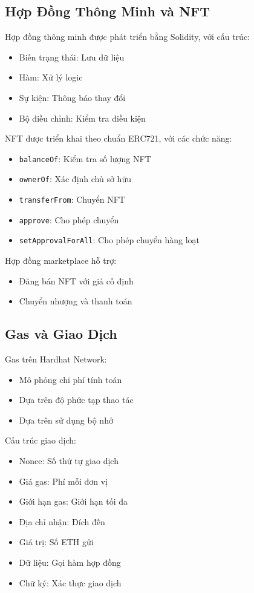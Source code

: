 \subsection{Hợp Đồng Thông Minh và NFT}
Hợp đồng thông minh được phát triển bằng Solidity, với cấu trúc:
\begin{itemize}
    \item Biến trạng thái: Lưu dữ liệu
    \item Hàm: Xử lý logic
    \item Sự kiện: Thông báo thay đổi
    \item Bộ điều chỉnh: Kiểm tra điều kiện
\end{itemize}
NFT được triển khai theo chuẩn ERC721, với các chức năng:
\begin{itemize}
    \item \texttt{balanceOf}: Kiểm tra số lượng NFT
    \item \texttt{ownerOf}: Xác định chủ sở hữu
    \item \texttt{transferFrom}: Chuyển NFT
    \item \texttt{approve}: Cho phép chuyển
    \item \texttt{setApprovalForAll}: Cho phép chuyển hàng loạt
\end{itemize}
Hợp đồng marketplace hỗ trợ:
\begin{itemize}
    \item Đăng bán NFT với giá cố định
    \item Chuyển nhượng và thanh toán
\end{itemize}

\subsection{Gas và Giao Dịch}
Gas trên Hardhat Network:
\begin{itemize}
    \item Mô phỏng chi phí tính toán
    \item Dựa trên độ phức tạp thao tác
    \item Dựa trên sử dụng bộ nhớ
\end{itemize}
Cấu trúc giao dịch:
\begin{itemize}
    \item Nonce: Số thứ tự giao dịch
    \item Giá gas: Phí mỗi đơn vị
    \item Giới hạn gas: Giới hạn tối đa
    \item Địa chỉ nhận: Đích đến
    \item Giá trị: Số ETH gửi
    \item Dữ liệu: Gọi hàm hợp đồng
    \item Chữ ký: Xác thực giao dịch
\end{itemize}

